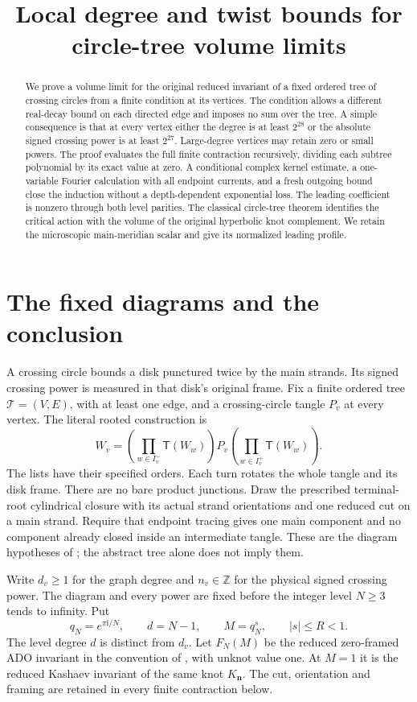 \documentclass[11pt]{article}
\title{Local degree and twist bounds for circle-tree volume limits}
\author{}\date{}
\numberwithin{equation}{section}
\theoremstyle{definition}\newtheorem{definition}[theorem]{Definition}
\theoremstyle{remark}\newtheorem{remark}[theorem]{Remark}
\newcommand{\ii}{\mathrm i}
\newcommand{\Turn}{\mathsf T}
\begin{document}
\maketitle
\begin{abstract}
We prove a volume limit for the original reduced invariant of a fixed
ordered tree of crossing circles from a finite condition at its vertices.
The condition allows a different real-decay bound on each directed edge
and imposes no sum over the tree. A simple consequence is that at every
vertex either the degree is at least \(2^{28}\) or the absolute signed
crossing power is at least \(2^{27}\). Large-degree vertices may retain
zero or small powers. The proof evaluates the full finite contraction
recursively, dividing each subtree polynomial by its exact value at zero.
A conditional complex kernel estimate, a one-variable Fourier calculation
with all endpoint currents, and a fresh outgoing bound close the induction
without a depth-dependent exponential loss. The leading coefficient is
nonzero through both level parities. The classical circle-tree theorem
identifies the critical action with the volume of the original hyperbolic
knot complement. We retain the microscopic main-meridian scalar and give
its normalized leading profile.
\end{abstract}

\section{The fixed diagrams and the conclusion}\label{dt:intro}
A crossing circle bounds a disk punctured twice by the main strands.
Its signed crossing power is measured in that disk's original frame.
Fix a finite ordered tree \(\mathcal T=(V,E)\), with at least one edge,
and a crossing-circle tangle \(P_v\) at every vertex. The literal rooted
construction is
\[
 W_v=\left(\prod_{w\in I_v^-}\Turn(W_w)\right)P_v
           \left(\prod_{w\in I_v^+}\Turn(W_w)\right).
\]
The lists have their specified orders. Each turn rotates the whole tangle
and its disk frame. There are no bare product junctions. Draw the
prescribed terminal-root cylindrical closure with its actual strand
orientations and one reduced cut on a main strand. Require that endpoint
tracing gives one main component and no component already closed inside
an intermediate tangle. These are the diagram hypotheses of
\cite[Section~1]{Geometry}; the abstract tree alone does not imply them.

Write \(d_v\ge1\) for the graph degree and \(n_v\in\mathbb Z\) for the
physical signed crossing power. The diagram and every power are fixed
before the integer level \(N\ge3\) tends to infinity. Put
\[
 q_N=e^{\pi\ii/N},\qquad d=N-1,\qquad M=q_N^s,\qquad |s|\le R<1.
\]
The level degree \(d\) is distinct from \(d_v\). Let \(F_N(M)\) be the
reduced zero-framed ADO invariant in the convention of \cite{Meridian},
with unknot value one. At \(M=1\) it is the reduced Kashaev invariant of
the same knot \(K_{\mathbf n}\). The cut, orientation and framing are
retained in every finite contraction below.
\end{document}
